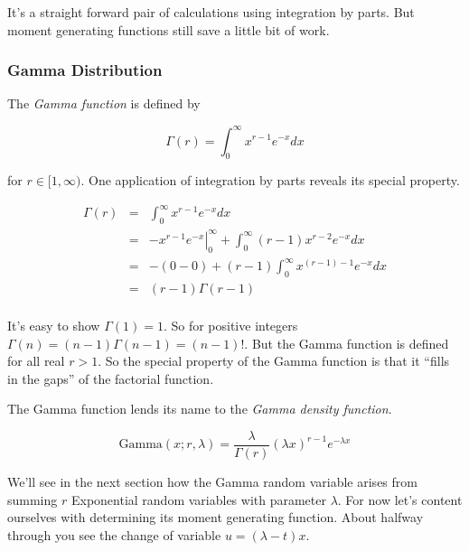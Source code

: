 \documentclass[]{article}
\begin{document}
It's a straight forward pair of calculations using integration
by parts. But moment generating functions still save a little
bit of work.

\subsubsection{Gamma Distribution}

The \emph{Gamma function} is defined by

\begin{equation} \label{gamma_function}
\Gamma(r) = \int_{0}^{\infty} x^{r-1} e^{-x} dx
\end{equation}

for $r \in [1,\infty)$.
One application of integration by parts reveals its
special property.

\begin{eqnarray*}
\Gamma(r) &= &\int_{0}^{\infty} x^{r-1} e^{-x} dx \\
  &= &\left. -x^{r-1}e^{-x} \right|_0^{\infty}
     + \int_0^{\infty} (r-1)x^{r-2} e^{-x} dx \\
  &= &-(0 - 0) + (r-1) \int_0^{\infty} x^{(r-1) - 1} e^{-x} dx \\
  &= &(r-1) \Gamma(r-1) \\
\end{eqnarray*}

It's easy to show $\Gamma(1)=1$.  So for positive integers
$\Gamma(n) = (n-1)\Gamma(n-1) = (n-1)!$.  But the Gamma function
is defined for all real $r>1$.  So the special property of the
Gamma function is that it
``fills in the gaps'' of the factorial function.

The Gamma function lends its name to the
\emph{Gamma density function}.

\begin{equation} \label{gamma_density}
\mbox{Gamma}(x; r, \lambda) = \frac{\lambda}{\Gamma(r)} 
     (\lambda x)^{r-1} e^{- \lambda x}
\end{equation}

We'll see in the next section how the Gamma random variable
arises from summing $r$ Exponential random variables with
parameter $\lambda$.
For now let's content ourselves with determining its moment
generating function.  About halfway through you see the change
of variable $u = (\lambda - t)x$.
\end{document}
